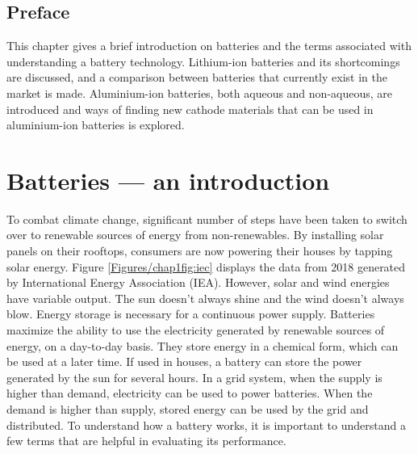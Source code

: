 
\section*{\centering Preface}
This chapter gives a brief introduction on batteries and the terms associated with understanding a battery technology. Lithium-ion batteries and its shortcomings are discussed, and a comparison between batteries that currently exist in the market is made. Aluminium-ion batteries, both aqueous and non-aqueous, are introduced and ways of finding new cathode materials that can be used in aluminium-ion batteries is explored.
\newpage
\chapter{Batteries --- an introduction} %
 \label{chap1} %
\newcommand{\keyword}[1]{\textbf{#1}}
\newcommand{\tabhead}[1]{\textbf{#1}}
\newcommand{\code}[1]{\texttt{#1}}
\newcommand{\file}[1]{\texttt{\bfseries#1}}
\newcommand{\option}[1]{\texttt{\itshape#1}}

To combat climate change, significant number of steps have been taken to switch over to renewable sources of energy from non-renewables. By installing solar panels on their rooftops, consumers are now powering their houses by tapping solar energy. Figure \ref{Figures/chap1fig:iec} displays the data from 2018 generated by International Energy Association (IEA). However, solar and wind energies have variable output. The sun doesn't always shine and the wind doesn't always blow. Energy storage is necessary for a continuous power supply. Batteries maximize the ability to use the electricity generated by renewable sources of energy, on a day-to-day basis. They store energy in a chemical form, which can be used at a later time. If used in houses, a battery can store the power generated by the sun for several hours. In a grid system, when the supply is higher than demand, electricity can be used to power batteries. When the demand is higher than supply, stored energy can be used by the grid and distributed. To understand how a battery works, it is important to understand a few terms that are helpful in evaluating its performance.  

